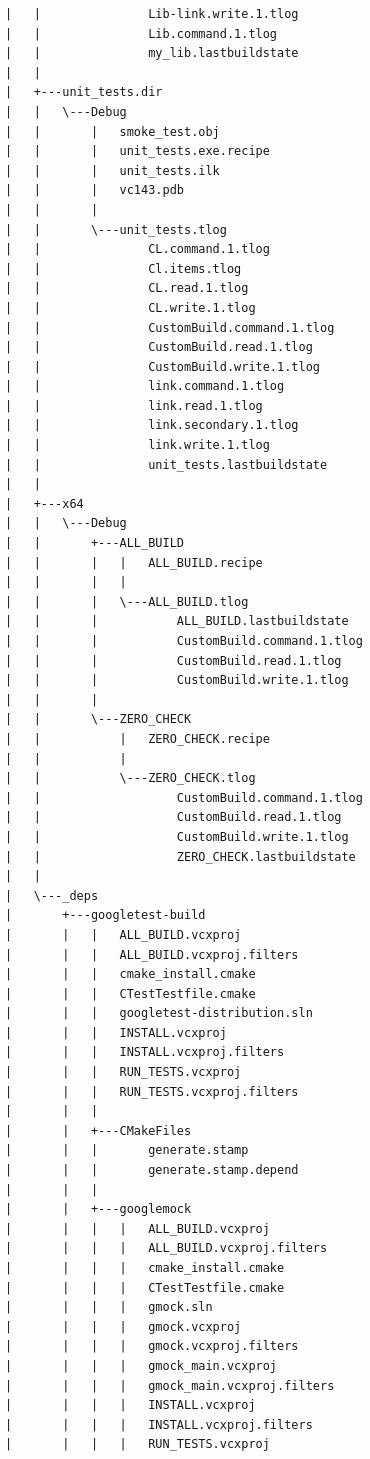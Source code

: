 \documentclass[12pt,a4paper]{article}
\begin{document}
\begin{verbatim}
|   |               Lib-link.write.1.tlog
|   |               Lib.command.1.tlog
|   |               my_lib.lastbuildstate
|   |               
|   +---unit_tests.dir
|   |   \---Debug
|   |       |   smoke_test.obj
|   |       |   unit_tests.exe.recipe
|   |       |   unit_tests.ilk
|   |       |   vc143.pdb
|   |       |   
|   |       \---unit_tests.tlog
|   |               CL.command.1.tlog
|   |               Cl.items.tlog
|   |               CL.read.1.tlog
|   |               CL.write.1.tlog
|   |               CustomBuild.command.1.tlog
|   |               CustomBuild.read.1.tlog
|   |               CustomBuild.write.1.tlog
|   |               link.command.1.tlog
|   |               link.read.1.tlog
|   |               link.secondary.1.tlog
|   |               link.write.1.tlog
|   |               unit_tests.lastbuildstate
|   |               
|   +---x64
|   |   \---Debug
|   |       +---ALL_BUILD
|   |       |   |   ALL_BUILD.recipe
|   |       |   |   
|   |       |   \---ALL_BUILD.tlog
|   |       |           ALL_BUILD.lastbuildstate
|   |       |           CustomBuild.command.1.tlog
|   |       |           CustomBuild.read.1.tlog
|   |       |           CustomBuild.write.1.tlog
|   |       |           
|   |       \---ZERO_CHECK
|   |           |   ZERO_CHECK.recipe
|   |           |   
|   |           \---ZERO_CHECK.tlog
|   |                   CustomBuild.command.1.tlog
|   |                   CustomBuild.read.1.tlog
|   |                   CustomBuild.write.1.tlog
|   |                   ZERO_CHECK.lastbuildstate
|   |                   
|   \---_deps
|       +---googletest-build
|       |   |   ALL_BUILD.vcxproj
|       |   |   ALL_BUILD.vcxproj.filters
|       |   |   cmake_install.cmake
|       |   |   CTestTestfile.cmake
|       |   |   googletest-distribution.sln
|       |   |   INSTALL.vcxproj
|       |   |   INSTALL.vcxproj.filters
|       |   |   RUN_TESTS.vcxproj
|       |   |   RUN_TESTS.vcxproj.filters
|       |   |   
|       |   +---CMakeFiles
|       |   |       generate.stamp
|       |   |       generate.stamp.depend
|       |   |       
|       |   +---googlemock
|       |   |   |   ALL_BUILD.vcxproj
|       |   |   |   ALL_BUILD.vcxproj.filters
|       |   |   |   cmake_install.cmake
|       |   |   |   CTestTestfile.cmake
|       |   |   |   gmock.sln
|       |   |   |   gmock.vcxproj
|       |   |   |   gmock.vcxproj.filters
|       |   |   |   gmock_main.vcxproj
|       |   |   |   gmock_main.vcxproj.filters
|       |   |   |   INSTALL.vcxproj
|       |   |   |   INSTALL.vcxproj.filters
|       |   |   |   RUN_TESTS.vcxproj

\end{verbatim}
\end{document}
